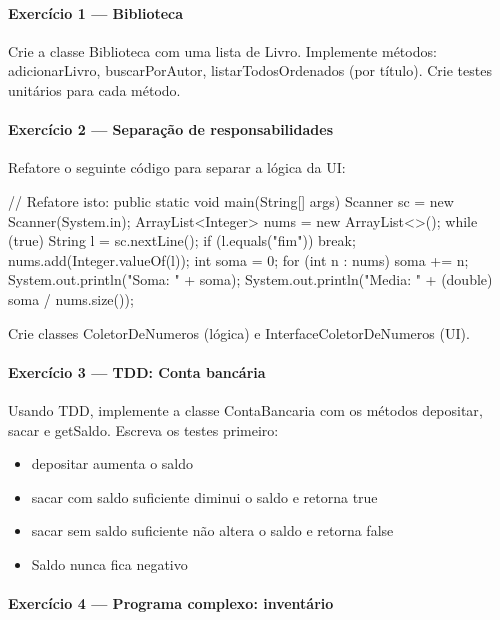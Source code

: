 \documentclass[11pt,a4paper]{article}
\renewcommand{\texttt}[1]{{\color{javaCodeInline}\small\ttfamily #1}}
\begin{document}
\paragraph{Exercício 1 --- Biblioteca}

Crie a classe \texttt{Biblioteca} com uma lista de \texttt{Livro}. Implemente métodos: \texttt{adicionarLivro}, \texttt{buscarPorAutor}, \texttt{listarTodosOrdenados} (por título). Crie testes unitários para cada método.

\paragraph{Exercício 2 --- Separação de responsabilidades}

Refatore o seguinte código para separar a lógica da UI:

\begin{javacode}
// Refatore isto:
public static void main(String[] args) {
    Scanner sc = new Scanner(System.in);
    ArrayList<Integer> nums = new ArrayList<>();
    while (true) {
        String l = sc.nextLine();
        if (l.equals("fim")) break;
        nums.add(Integer.valueOf(l));
    }
    int soma = 0;
    for (int n : nums) soma += n;
    System.out.println("Soma: " + soma);
    System.out.println("Media: " + (double) soma / nums.size());
}
\end{javacode}

Crie classes \texttt{ColetorDeNumeros} (lógica) e \texttt{InterfaceColetorDeNumeros} (UI).

\paragraph{Exercício 3 --- TDD: Conta bancária}

Usando TDD, implemente a classe \texttt{ContaBancaria} com os métodos \texttt{depositar}, \texttt{sacar} e \texttt{getSaldo}. Escreva os testes primeiro:
\begin{itemize}
\item \texttt{depositar} aumenta o saldo
\item \texttt{sacar} com saldo suficiente diminui o saldo e retorna \texttt{true}
\item \texttt{sacar} sem saldo suficiente não altera o saldo e retorna \texttt{false}
\item Saldo nunca fica negativo
\end{itemize}

\paragraph{Exercício 4 --- Programa complexo: inventário}
\end{document}

